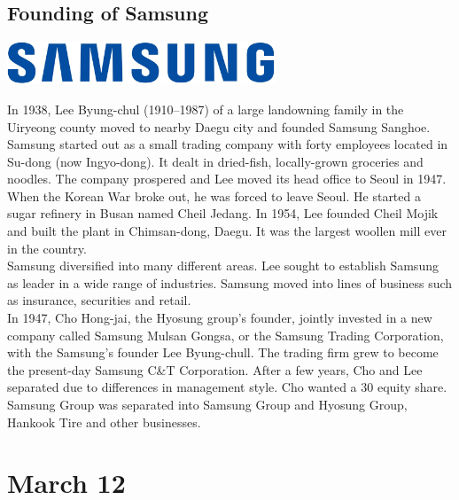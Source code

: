 \documentclass[11pt]{report}
\begin{document}
\subsection{Founding of Samsung}
\vspace{2mm}\begin{center}\includegraphics[width=8cm]{./img/samsungLogo.jpg}\end{center}
In 1938, Lee Byung-chul (1910–1987) of a large landowning family in the Uiryeong county moved to nearby Daegu city and founded Samsung Sanghoe. Samsung started out as a small trading company with forty employees located in Su-dong (now Ingyo-dong). It dealt in dried-fish, locally-grown groceries and noodles. The company prospered and Lee moved its head office to Seoul in 1947. When the Korean War broke out, he was forced to leave Seoul. He started a sugar refinery in Busan named Cheil Jedang. In 1954, Lee founded Cheil Mojik and built the plant in Chimsan-dong, Daegu. It was the largest woollen mill ever in the country.\\
\indent Samsung diversified into many different areas. Lee sought to establish Samsung as leader in a wide range of industries. Samsung moved into lines of business such as insurance, securities and retail.\\ \indent In 1947, Cho Hong-jai, the Hyosung group's founder, jointly invested in a new company called Samsung Mulsan Gongsa, or the Samsung Trading Corporation, with the Samsung's founder Lee Byung-chull. The trading firm grew to become the present-day Samsung C\&T Corporation. After a few years, Cho and Lee separated due to differences in management style. Cho wanted a 30 equity share. Samsung Group was separated into Samsung Group and Hyosung Group, Hankook Tire and other businesses.
\section{March 12}
\end{document}
